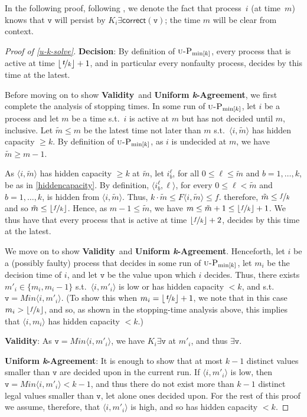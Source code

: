 \documentclass[11pt]{article}
\theoremstyle{definition}
\newcommand{\mv}{\mathtt{v}}
\newcommand{\existsv}{\exists{\mv}}
\newcommand{\knownf}[1]{\ensuremath{F\node{#1}}}
\newcommand{\minval}[1]{\ensuremath{\mathit{Min}\node{#1}}}
\newcommand{\defemph}[1]{\textbf{\textit{#1}}}
\newcommand{\tee}{\,\defemph{t}}
\newcommand{\UOptMink}{\mbox{$\mbox{\sc u-P}_{\min[k]}$}}
\newcommand{\node}[1]{\langle#1\rangle}
\newcommand{\cv}{\exists\mathsf{correct}(\mathtt{v})}
\newcommand{\UnikAg}{{\bf Uniform \defemph{k}-Agreement}}
\newcommand{\Decision}{{\bf Decision}}
\newcommand{\Validity}{{\bf Validity}}
\newcommand{\valv}{\veee}
\newcommand{\veee}{\mathtt{v}}
\begin{document}
In the following proof, following \cite{AYY-DISC}, we denote the fact that process~$i$ (at time~$m$) knows that $\valv$ will persist by $K_i\cv$; the time $m$ will be clear from context.

\begin{proof}[Proof of \cref{u-k-solve}]

\Decision:
By definition of $\UOptMink$, every process that is active at time $\lfloor\nicefrac{\tee}{k}\rfloor+1$,
and in particular every nonfaulty process, decides by this time at the latest.

Before moving on to show \Validity\ and \UnikAg, we first complete the analysis of stopping times.
In some run of $\UOptMink$, let $i$ be a process and let $m$ be a time s.t.\ $i$ is active at $m$ but has not decided until $m$, inclusive.
Let $\tilde{m}\le m$ be the latest time not later than $m$ s.t.\ $\node{i,\tilde{m}}$ has hidden capacity $\ge k$. By definition
of $\UOptMink$, as $i$ is undecided at $m$, we have $\tilde{m} \ge m-1$.

As $\node{i,\tilde{m}}$ has hidden capacity $\ge k$ at $\tilde{m}$, let $i_b^{\ell}$, for all $0\le\ell\le \tilde{m}$ and $b=1,\ldots,k$, be as in \cref{hiddencapacity}.
By definition, $\node{i_b^{\ell},\ell}$, for every $0\le\ell < \tilde{m}$ and $b=1,\ldots,k$, is hidden from $\node{i,\tilde{m}}$.
Thus, $k\cdot \tilde{m} \le \knownf{i,\tilde{m}} \le f$.
therefore, $\tilde{m} \le \nicefrac{f}{k}$ and so $\tilde{m} \le \lfloor\nicefrac{f}{k}\rfloor$.
Hence, as $m-1 \le \tilde{m}$, we have $m \le \tilde{m}+1 \le \lfloor \nicefrac{f}{k} \rfloor + 1$.
We thus have that every process that is active at time $\lfloor\nicefrac{f}{k}\rfloor+2$, decides by this time at the latest.

We move on to show \Validity\ and \UnikAg. Henceforth,
let $i$ be a (possibly faulty) process that decides in some run of $\UOptMink$, let $m_i$ be the decision time of $i$, and
let $\mathtt{v}$ be the value upon which $i$ decides.
Thus, there exists $m'_i \in \{m_i,m_i-1\}$ s.t.\ $\node{i,m'_i}$ is low or has hidden capacity $<k$, and s.t.\ $\mathtt{v} = \minval{i,m'_i}$.
(To show this when $m_i=\lfloor\nicefrac{\tee}{k}\rfloor+1$, we note that in this case $m_i>\lfloor\nicefrac{f}{k}\rfloor$, and so, as shown in the stopping-time analysis above, this implies that $\node{i,m_i}$ has hidden capacity $<k$.)

\Validity:
As $\mathtt{v}=\minval{i,m'_i}$, we have $K_i\existsv$ at $m'_i$, and thus $\existsv$.

\UnikAg:
It is enough to show that at most $k-1$ distinct values
smaller than $\mathtt{v}$ are decided upon in the current run.
If $\node{i,m'_i}$ is low, then $\mathtt{v} = \minval{i,m'_i} < k-1$, and thus there do not exist more than $k-1$ distinct legal values smaller than $\mathtt{v}$, let alone ones decided
upon. For the rest of this proof we assume, therefore, that $\node{i,m'_i}$ is high, and so has hidden capacity $<k$.


\end{proof}
\end{document}
